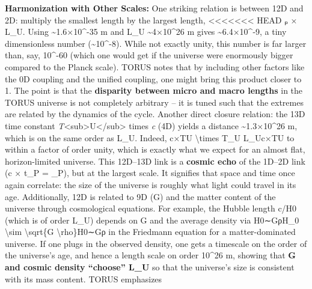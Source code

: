 \documentclass[]{article}
\begin{document}
\textbf{Harmonization with Other Scales:} One striking relation is
between 12D and 2D: multiply the smallest length by the largest length,
<<<<<<< HEAD
\emph{\ell}ₚ × L\_U. Using  \textasciitilde1.6×10\^{}-35 m and L\_U
\textasciitilde4×10\^{}26 m gives \textasciitilde6.4×10\^{}-9, a tiny
dimensionless number (\textasciitilde10\^{}-8)\hspace{0pt}. While not
exactly unity, this number is far larger than, say, 10\^{}-60 (which one
would get if the universe were enormously bigger compared to the Planck
scale). TORUS notes that by including other factors like the 0D coupling
and the unified coupling, one might bring this product closer to
1\hspace{0pt}. The point is that the \textbf{disparity between micro and
macro lengths} in the TORUS universe is not completely arbitrary -- it
is tuned such that the extremes are related by the dynamics of the
cycle\hspace{0pt}. Another direct closure relation: the 13D time
constant \emph{T}\textless sub\textgreater U\textless/sub\textgreater{}
times \emph{c} (4D) yields a distance \textasciitilde1.3×10\^{}26 m,
which is on the same order as L\_U\hspace{0pt}. Indeed, c×TU\approxLUc
\textbackslash times T\_U \approx L\_Uc×TU\hspace{0pt}\approxLU\hspace{0pt} to
within a factor of order unity, which is exactly what we expect for an
almost flat, horizon-limited universe. This 12D--13D link is a
\textbf{cosmic echo} of the 1D--2D link (c × t\_P = \ell\_P), but at the
largest scale\hspace{0pt}. It signifies that space and time once again
correlate: the size of the universe is roughly what light could travel
in its age. Additionally, 12D is related to 9D (G) and the matter
content of the universe through cosmological equations. For example, the
Hubble length c/H0 (which is of order L\_U) depends on G and the average
density via H0∼GρH\_0 \textbackslash sim \textbackslash sqrt\{G
\textbackslash rho\}H0\hspace{0pt}∼Gρ\hspace{0pt} in the Friedmann
equation for a matter-dominated universe\hspace{0pt}. If one plugs in
the observed density, one gets a timescale on the order of the
universe's age, and hence a length scale on order 10\^{}26 m, showing
that \textbf{G and cosmic density ``choose'' L\_U} so that the
universe's size is consistent with its mass content. TORUS emphasizes
\end{document}
